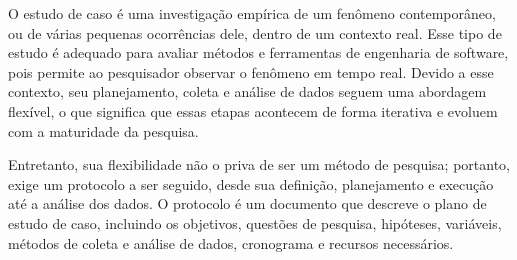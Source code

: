 O estudo de caso é uma investigação empírica de um fenômeno contemporâneo, ou de várias pequenas ocorrências dele, dentro de um contexto real. Esse tipo de estudo é adequado para avaliar métodos e ferramentas de engenharia de software, pois permite ao pesquisador observar o fenômeno em tempo real. Devido a esse contexto, seu planejamento, coleta e análise de dados seguem uma abordagem flexível, o que significa que essas etapas acontecem de forma iterativa e evoluem com a maturidade da pesquisa.

Entretanto, sua flexibilidade não o priva de ser um método de pesquisa; portanto, exige um protocolo a ser seguido, desde sua definição, planejamento e execução até a análise dos dados. O protocolo é um documento que descreve o plano de estudo de caso, incluindo os objetivos, questões de pesquisa, hipóteses, variáveis, métodos de coleta e análise de dados, cronograma e recursos necessários. \cite{yin2001estudo}

